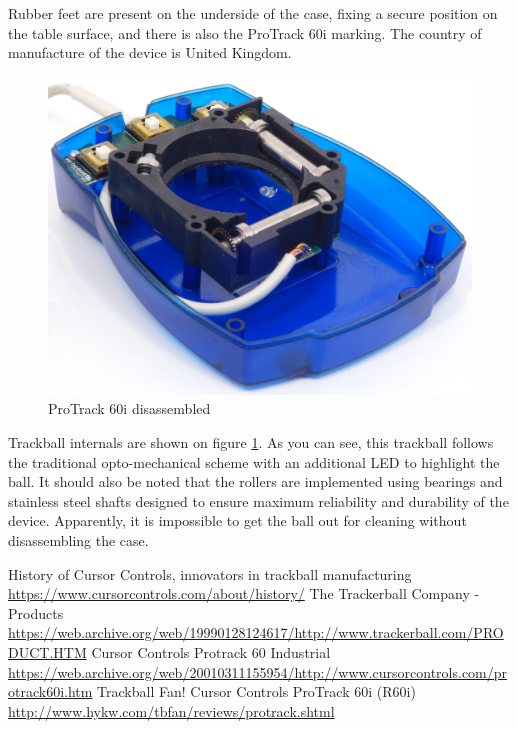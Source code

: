 \documentclass[11pt, a4paper]{article}
\begin{document}
Rubber feet are present on the underside of the case, fixing a secure position on the table surface, and there is also the ProTrack 60i marking. The country of manufacture of the device is United Kingdom.

\begin{figure}[h]
    \centering
    \includegraphics[scale=0.6]{1999_protrack_60i/razobr3_60.jpg}
    \caption{ProTrack 60i disassembled}
    \label{fig:ProTrack60iInside}
\end{figure}

Trackball internals are shown on figure \ref{fig:ProTrack60iInside}. As you can see, this trackball follows the traditional opto-mechanical scheme with an additional LED to highlight the ball. It should also be noted that the rollers are implemented using bearings and stainless steel shafts designed to ensure maximum reliability and durability of the device.
Apparently, it is impossible to get the ball out for cleaning without disassembling the case.

\begin{thebibliography}{9}
 History of Cursor Controls, innovators in trackball manufacturing \url{https://www.cursorcontrols.com/about/history/}
 The Trackerball Company - Products \url{https://web.archive.org/web/19990128124617/http://www.trackerball.com/PRODUCT.HTM}
 Cursor Controls Protrack 60 Industrial \url{https://web.archive.org/web/20010311155954/http://www.cursorcontrols.com/protrack60i.htm}
 Trackball Fan! Cursor Controls ProTrack 60i (R60i) \url{http://www.hykw.com/tbfan/reviews/protrack.shtml}
\end{thebibliography}
\end{document}

